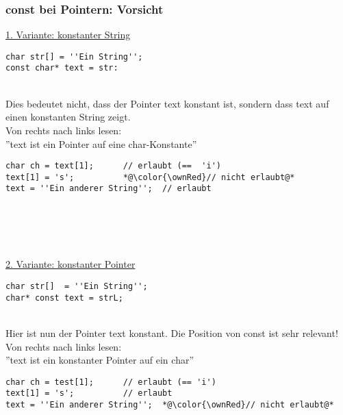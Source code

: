 \subsubsection{const bei Pointern: Vorsicht\hfill}
\label{sec:unterunterabschnitt}
\underline{1. Variante: konstanter String}\\
\noindent
\begin{minipage}{\linewidth}
\begin{lstlisting}
char str[] = ''Ein String'';
const char* text = str:
\end{lstlisting}
\end{minipage}
\\
Dies bedeutet nicht, dass der Pointer text konstant ist, sondern dass text auf einen konstanten String zeigt.\\
Von rechts nach links lesen:\\ ''text ist ein Pointer auf eine char-Konstante''\\
\noindent
\begin{minipage}{\linewidth}
\begin{lstlisting}
char ch = text[1];		// erlaubt (==  'i')
text[1] = 's';			*@\color{\ownRed}// nicht erlaubt@*
text = ''Ein anderer String'';	// erlaubt
\end{lstlisting}
\end{minipage}
\\ \\ \\ \\
\underline{2. Variante: konstanter Pointer}\\
\noindent
\begin{minipage}{\linewidth}
\begin{lstlisting}
char str[]  = ''Ein String'';
char* const text = strL;
\end{lstlisting}
\end{minipage}
\\
Hier ist nun der Pointer text konstant. Die Position von const ist sehr relevant!\\
Von rechts nach links lesen:\\ ''text ist ein konstanter Pointer auf ein char''\\
\noindent
\begin{minipage}{\linewidth}
\begin{lstlisting}
char ch = test[1];		// erlaubt (== 'i')
text[1] = 's';			// erlaubt
text = ''Ein anderer String'';	*@\color{\ownRed}// nicht erlaubt@*
\end{lstlisting}
\end{minipage}
